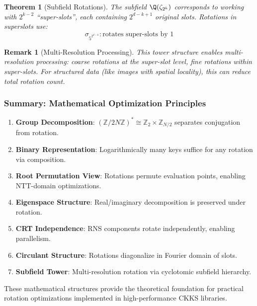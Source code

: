\documentclass[11pt,a4paper]{article}
\newtheorem{theorem}{Theorem}
\newtheorem{remark}{Remark}
\newcommand{\Z}{\mathbb{Z}}
\begin{document}
\begin{theorem}[Subfield Rotations]
The subfield $\Q(\zeta_{2^k})$ corresponds to working with $2^{k-2}$ ``super-slots'', each containing $2^{d-k+1}$ original slots. Rotations in superslots use:
\[
\sigma_{5^{2^{d-k}}} : \text{rotates super-slots by 1}
\]
\end{theorem}

\begin{remark}[Multi-Resolution Processing]
This tower structure enables multi-resolution processing: coarse rotations at the super-slot level, fine rotations within super-slots. For structured data (like images with spatial locality), this can reduce total rotation count.
\end{remark}

\subsubsection{Summary: Mathematical Optimization Principles}

\begin{enumerate}
    \item \textbf{Group Decomposition}: $(\Z/2N\Z)^* \cong \Z_2 \times \Z_{N/2}$ separates conjugation from rotation.
    
    \item \textbf{Binary Representation}: Logarithmically many keys suffice for any rotation via composition.
    
    \item \textbf{Root Permutation View}: Rotations permute evaluation points, enabling NTT-domain optimizations.
    
    \item \textbf{Eigenspace Structure}: Real/imaginary decomposition is preserved under rotation.
    
    \item \textbf{CRT Independence}: RNS components rotate independently, enabling parallelism.
    
    \item \textbf{Circulant Structure}: Rotations diagonalize in Fourier domain of slots.
    
    \item \textbf{Subfield Tower}: Multi-resolution rotation via cyclotomic subfield hierarchy.
\end{enumerate}

These mathematical structures provide the theoretical foundation for practical rotation optimizations implemented in high-performance CKKS libraries.
\end{document}
